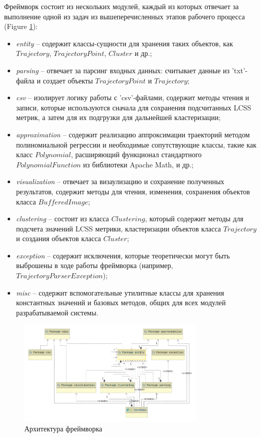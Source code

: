 Фреймворк состоит из нескольких модулей, каждый из которых отвечает за выполнение одной из задач из вышеперечисленных этапов рабочего процесса (Figure \ref{fig:proj-arch}):
\begin{itemize}
	\item \textit{entity} -- содержит классы-сущности для хранения таких объектов, как $Trajectory$, $TrajectoryPoint$, $Cluster$ и др.;
	\item \textit{parsing} -- отвечает за парсинг входных данных: считывает данные из 'txt'-файла и создает объекты $TrajectoryPoint$ и $Trajectory$;
	\item \textit{csv} -- изолирует логику работы с 'csv'-файлами, содержит методы чтения и записи, которые используются сначала для сохранения подсчитанных LCSS метрик, а затем для их подгрузки для дальнейшей кластеризации;
	\item \textit{approximation} -- содержит реализацию аппроксимации траекторий методом полиномиальной регрессии и необходимые сопутствующие классы, такие как класс $Polynomial$, расширяющий функционал стандартного $PolynomialFunction$ из библиотеки Apache Math, и др.;
	\item \textit{visualization} -- отвечает за визаулизацию и сохранение полученных результатов, содержит методы для чтения, изменения, сохранения объектов класса $BufferedImage$;
	\item \textit{clustering} -- состоит из класса $Clustering$, который содержит методы для подсчета значений LCSS метрики, кластеризации объектов класса $Trajectory$ и создания объектов класса $Cluster$;
	\item \textit{exception} -- содержит исключения, которые теоретически могут быть выброшены в ходе работы фреймворка (например, $TrajectoryParserException$);
	\item \textit{misc} -- содержит вспомогательные утилитные классы для хранения константных значений и базовых методов, общих для всех модулей разрабатываемой системы.
\end{itemize}

\begin{figure}[!htb]
	\centering{}
	\includegraphics[width=0.8\textwidth]{images/proj-arch.png}
	\caption{Архитектура фреймворка}
	\label{fig:proj-arch}
\end{figure}

